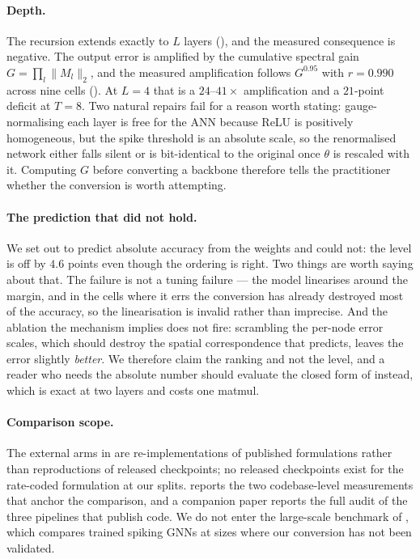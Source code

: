 \paragraph{Depth.} The recursion extends exactly to $L$ layers (), and the
measured consequence is negative. The output error is amplified by the cumulative spectral gain $G=\prod_l\lVert M_l\rVert_{2}$, and the measured amplification follows $G^{0.95}$ with $r=0.990$ across nine cells (). At $L=4$ that is a $24$--$41\times$ amplification and a $21$-point deficit at $T=8$. Two natural repairs fail for a reason worth stating: gauge-normalising each layer is free for the ANN because ReLU is positively homogeneous, but the spike threshold is an absolute scale, so the renormalised network either falls silent or is bit-identical to the original once $\theta$ is rescaled with it. Computing $G$ before converting a backbone therefore tells the
practitioner whether the conversion is worth attempting.

\paragraph{The prediction that did not hold.} We set out to predict absolute accuracy from the weights and could not: the level is off by $4.6$ points even though the ordering is right. Two things are worth saying about that. The failure is not a tuning failure --- the model linearises around the margin, and in the cells where it errs the conversion has already destroyed most of the accuracy, so the linearisation is invalid rather than imprecise. And the ablation the mechanism implies does not fire: scrambling the per-node error scales, which should destroy the spatial correspondence that  predicts, leaves the error slightly \emph{better}. We therefore claim the ranking and not the level, and a reader who needs the absolute number should evaluate the closed form of  instead, which is exact at two layers and costs one matmul.

\paragraph{Comparison scope.} The external arms in  are
re-implementations of published formulations rather than reproductions of released
checkpoints; no released checkpoints exist for the rate-coded formulation at our splits.
 reports the two codebase-level measurements that anchor the comparison,
and a companion paper \citep{companion} reports the full audit of the three pipelines that
publish code. We do not enter the large-scale benchmark of \citet{zhang2025sgnnbench},
which compares trained spiking GNNs at sizes where our conversion has not been validated.

